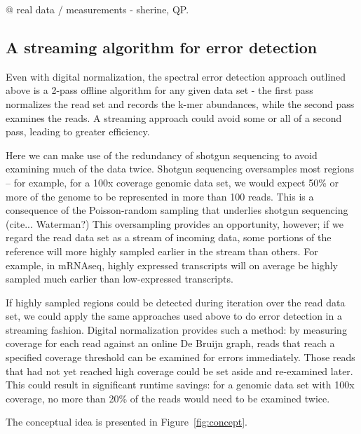 \documentclass{article}
\begin{document}
@ real data / measurements - sherine, QP.

\subsection{A streaming algorithm for error detection}

Even with digital normalization, the spectral error detection approach
outlined above is a 2-pass offline algorithm for any given data set -
the first pass normalizes the read set and records the k-mer
abundances, while the second pass examines the reads.  A streaming
approach could avoid some or all of a second pass, leading to
greater efficiency.

Here we can make use of the redundancy of shotgun sequencing to avoid
examining much of the data twice. Shotgun
sequencing oversamples most regions -- for example, for a 100x
coverage genomic data set, we would expect 50\% or more of the genome
to be represented in more than 100 reads.  This is a consequence of
the Poisson-random sampling that underlies shotgun sequencing
(cite... Waterman?)  This oversampling provides an opportunity,
however; if we regard the read data set as a stream of incoming data,
some portions of the reference will more highly sampled earlier in the
stream than others.  For example, in mRNAseq, highly expressed
transcripts will on average be highly sampled much earlier than
low-expressed transcripts.

If highly sampled regions could be detected during iteration over the
read data set, we could apply the same approaches used above to do
error detection in a streaming fashion.  Digital normalization
provides such a method: by measuring coverage for each read against an
online De Bruijn graph, reads that reach a specified coverage
threshold can be examined for errors immediately.  Those reads that
had not yet reached high coverage could be set aside and re-examined
later.  This could result in significant runtime savings: for a
genomic data set with 100x coverage, no more than 20\% of the reads
would need to be examined twice.

The conceptual idea is presented in Figure~\ref{fig:concept}.
\end{document}
